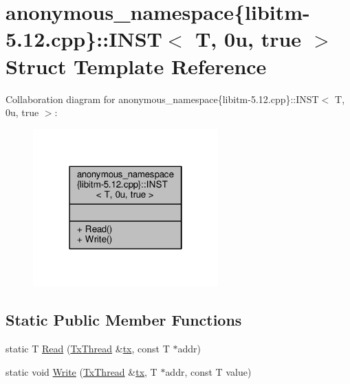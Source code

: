 \hypertarget{structanonymous__namespace_02libitm-5_812_8cpp_03_1_1INST_3_01T_00_010u_00_01true_01_4}{\section{anonymous\-\_\-namespace\{libitm-\/5.12.cpp\}\-:\-:I\-N\-S\-T$<$ T, 0u, true $>$ Struct Template Reference}
\label{structanonymous__namespace_02libitm-5_812_8cpp_03_1_1INST_3_01T_00_010u_00_01true_01_4}
}


Collaboration diagram for anonymous\-\_\-namespace\{libitm-\/5.12.cpp\}\-:\-:I\-N\-S\-T$<$ T, 0u, true $>$\-:
\nopagebreak
\begin{figure}[H]
\begin{center}
\leavevmode
\includegraphics[width=202pt]{structanonymous__namespace_02libitm-5_812_8cpp_03_1_1INST_3_01T_00_010u_00_01true_01_4__coll__graph}
\end{center}
\end{figure}
\subsection*{Static Public Member Functions}
\begin{DoxyCompactItemize}
\item 
static T \hyperlink{structanonymous__namespace_02libitm-5_812_8cpp_03_1_1INST_3_01T_00_010u_00_01true_01_4_a87767be3160584aa7bad991191ee0680}{Read} (\hyperlink{structstm_1_1TxThread}{Tx\-Thread} \&\hyperlink{stmskip_8cc_a0f1c58699b83ce5a08bd9ee859250d72}{tx}, const T $\ast$addr)
\item 
static void \hyperlink{structanonymous__namespace_02libitm-5_812_8cpp_03_1_1INST_3_01T_00_010u_00_01true_01_4_a35e8d273fefc1356f9886a762c67e78a}{Write} (\hyperlink{structstm_1_1TxThread}{Tx\-Thread} \&\hyperlink{stmskip_8cc_a0f1c58699b83ce5a08bd9ee859250d72}{tx}, T $\ast$addr, const T value)
\end{DoxyCompactItemize}



